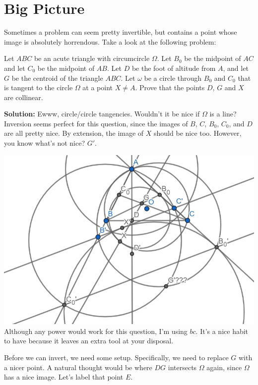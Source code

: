 \documentclass{scrartcl}
\begin{document}
\section{Big Picture}
Sometimes a problem can seem pretty invertible, but contains a point whose image is absolutely horrendous. Take a look at the following problem:
\begin{problem}[ISL 2011/G4] Let $ABC$ be an acute triangle with circumcircle $\Omega$. Let $B_0$ be the midpoint of $AC$ and let $C_0$ be the midpoint of $AB$. Let $D$ be the foot of altitude from $A$, and let $G$ be the centroid of the triangle $ABC$. Let $\omega$ be a circle through $B_0$ and $C_0$ that is tangent to the circle $\Omega$ at a point $X \neq A$. Prove that the points $D$, $G$ and $X$ are collinear.
\end{problem}
\textbf{Solution:} Ewww, circle/circle tangencies. Wouldn't it be nice if $\Omega$ is a line? \newline
Inversion seems perfect for this question, since the images of $B$, $C$, $B_0$, $C_0$, and $D$ are all pretty nice. By extension, the image of $X$ should be nice too. However, you know what's not nice? $G'$.\newline
\begin{center}
    \includegraphics[scale=0.8]{isl2011g4r1.jpg} \\
    {\footnotesize Although any power would work for this question, I'm using $bc$. It's a nice habit to have because it leaves an extra tool at your disposal.}
\end{center}
Before we can invert, we need some setup. Specifically, we need to replace $G$ with a nicer point. A natural thought would be where $DG$ intersects $\Omega$ again, since $\Omega$ has a nice image. Let's label that point $E$. \newline
\end{document}
